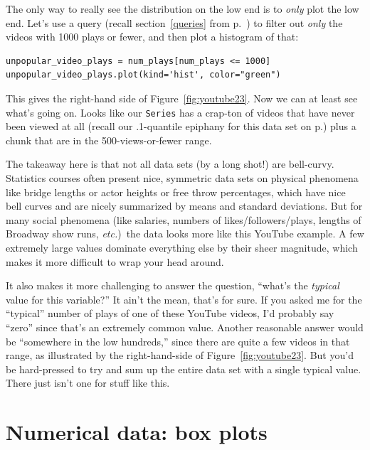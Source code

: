 
The only way to really see the distribution on the low end is to \textit{only}
plot the low end. Let's use a query (recall section~\ref{queries} from
p.~\pageref{queries}) to filter out \textit{only} the videos with 1000 plays or
fewer, and then plot a histogram of that:

\begin{Verbatim}[fontsize=\scriptsize,samepage=true,frame=single,framesep=3mm]
unpopular_video_plays = num_plays[num_plays <= 1000]
unpopular_video_plays.plot(kind='hist', color="green")
\end{Verbatim}

This gives the right-hand side of Figure~\ref{fig:youtube23}. Now we can at
least see what's going on. Looks like our \texttt{Series} has a crap-ton of
videos that have never been viewed at all (recall our .1-quantile epiphany for
this data set on p.\pageref{pointOneQuantileEpiphany}) plus a chunk that are in
the 500-views-or-fewer range.


The takeaway here is that not all data sets (by a long shot!) are bell-curvy.
Statistics courses often present nice, symmetric data sets on physical
phenomena like bridge lengths or actor heights or free throw percentages, which
have nice bell curves and are nicely summarized by means and standard
deviations. But for many social phenomena (like salaries, numbers of
likes/followers/plays, lengths of Broadway show runs, \textit{etc.})~the data
looks more like this YouTube example. A few extremely large values dominate
everything else by their sheer magnitude, which makes it more difficult to wrap
your head around.

It also makes it more challenging to answer the question, ``what's the
\textit{typical} value for this variable?'' It ain't the mean, that's for sure.
If you asked me for the ``typical'' number of plays of one of these YouTube
videos, I'd probably say ``zero'' since that's an extremely common value.
Another reasonable answer would be ``somewhere in the low hundreds,'' since
there are quite a few videos in that range, as illustrated by the
right-hand-side of Figure~\ref{fig:youtube23}. But you'd be hard-pressed to try
and sum up the entire data set with a single typical value. There just isn't
one for stuff like this.

\section{Numerical data: box plots}

